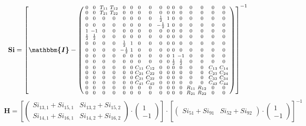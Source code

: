 \[ \mathbf{Si} = \left[ \boldsymbol{\mathbbm{I}}  -
\left(\begin{smallmatrix} 0 & 0 & T_{11} & T_{12} & 0 & 0 & 0 & 0 & 0
& 0 & 0 & 0 & 0 & 0 & 0 & 0 \\ 0 & 0 & T_{21} & T_{22} & 0 & 0 & 0 & 0
& 0 & 0 & 0 & 0 & 0 & 0 & 0 & 0 \\ 0 & 0 & 0 & 0 & 0 & 0 & 0 & 0 &
\frac{1}{2} & 1 & 0 & 0 & 0 & 0 & 0 & 0 \\ 0 & 0 & 0 & 0 & 0 & 0 & 0 &
0 & -\frac{1}{2} & 1 & 0 & 0 & 0 & 0 & 0 & 0 \\ 1 & -1 & 0 & 0 & 0 & 0
& 0 & 0 & 0 & 0 & 0 & 0 & 0 & 0 & 0 & 0 \\ \frac{1}{2} & \frac{1}{2} &
0 & 0 & 0 & 0 & 0 & 0 & 0 & 0 & 0 & 0 & 0 & 0 & 0 & 0 \\ 0 & 0 & 0 & 0
& \frac{1}{2} & 1 & 0 & 0 & 0 & 0 & 0 & 0 & 0 & 0 & 0 & 0 \\ 0 & 0 & 0
& 0 & -\frac{1}{2} & 1 & 0 & 0 & 0 & 0 & 0 & 0 & 0 & 0 & 0 & 0 \\ 0 &
0 & 0 & 0 & 0 & 0 & 0 & 0 & 0 & 0 & 1 & -1 & 0 & 0 & 0 & 0 \\ 0 & 0 &
0 & 0 & 0 & 0 & 0 & 0 & 0 & 0 & \frac{1}{2} & \frac{1}{2} & 0 & 0 & 0
& 0 \\ 0 & 0 & 0 & 0 & 0 & 0 & C_{11} & C_{12} & 0 & 0 & 0 & 0 & 0 & 0
& C_{13} & C_{14} \\ 0 & 0 & 0 & 0 & 0 & 0 & C_{21} & C_{22} & 0 & 0 &
0 & 0 & 0 & 0 & C_{23} & C_{24} \\ 0 & 0 & 0 & 0 & 0 & 0 & C_{31} &
C_{32} & 0 & 0 & 0 & 0 & 0 & 0 & C_{33} & C_{34} \\ 0 & 0 & 0 & 0 & 0
& 0 & C_{41} & C_{42} & 0 & 0 & 0 & 0 & 0 & 0 & C_{43} & C_{44} \\ 0 &
0 & 0 & 0 & 0 & 0 & 0 & 0 & 0 & 0 & 0 & 0 & R_{11} & R_{12} & 0 & 0 \\
0 & 0 & 0 & 0 & 0 & 0 & 0 & 0 & 0 & 0 & 0 & 0 & R_{21} & R_{22} & 0 &
0 \end{smallmatrix}\right) \right]^{-1} \]
\[ \mathbf{H} = \left[ \left(\begin{smallmatrix} Si_{13,1} + Si_{15,1}
& Si_{13,2} + Si_{15,2} \\ Si_{14,1} + Si_{16,1} & Si_{14,2} +
Si_{16,2} \end{smallmatrix}\right)\cdot \left(\begin{smallmatrix} 1 \\
-1 \end{smallmatrix}\right)\right]\cdot\left[
\left(\begin{smallmatrix} Si_{51} + Si_{91} & Si_{52} + Si_{92}
\end{smallmatrix}\right)\cdot \left(\begin{smallmatrix} 1 \\ -1
\end{smallmatrix}\right)\right]^{-1} \]
